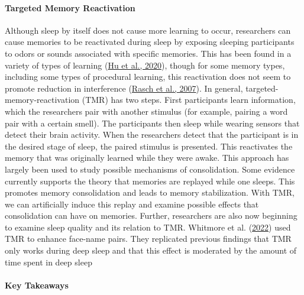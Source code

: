 \documentclass[
]{krantz}
\begin{document}
\hypertarget{targeted-memory-reactivation}{%
\paragraph*{Targeted Memory Reactivation}\label{targeted-memory-reactivation}}

Although sleep by itself does not cause more learning to occur, researchers can cause memories to be reactivated during sleep by exposing sleeping participants to odors or sounds associated with specific memories. This has been found in a variety of types of learning (\protect\hyperlink{ref-Hu2020}{Hu et al., 2020}), though for some memory types, including some types of procedural learning, this reactivation does not seem to promote reduction in interference (\protect\hyperlink{ref-Rasch2007}{Rasch et al., 2007}). In general, targeted-memory-reactivation (TMR) has two steps. First participants learn information, which the researchers pair with another stimulus (for example, pairing a word pair with a certain smell). The participants then sleep while wearing sensors that detect their brain activity. When the researchers detect that the participant is in the desired stage of sleep, the paired stimulus is presented. This reactivates the memory that was originally learned while they were awake. This approach has largely been used to study possible mechanisms of consolidation. Some evidence currently supports the theory that memories are replayed while one sleeps. This promotes memory consolidation and leads to memory stabilization. With TMR, we can artificially induce this replay and examine possible effects that consolidation can have on memories. Further, researchers are also now beginning to examine sleep quality and its relation to TMR. Whitmore et al. (\protect\hyperlink{ref-Whitmore2022}{2022}) used TMR to enhance face-name pairs. They replicated previous findings that TMR only works during deep sleep and that this effect is moderated by the amount of time spent in deep sleep

\hypertarget{key-takeaways-4}{%
\paragraph*{Key Takeaways}\label{key-takeaways-4}}
\end{document}
